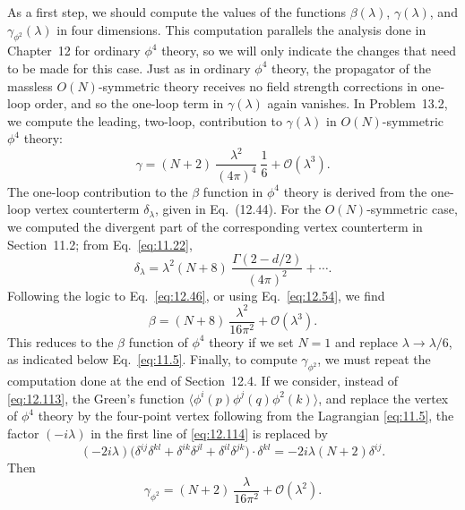 As a first step, we should compute the values of the functions
$\beta(\lambda)$, $\gamma(\lambda)$, and $\gamma_{\phi^2}(\lambda)$ in four
dimensions.  This computation parallels the analysis done in Chapter~12 for
ordinary $\phi^4$ theory, so we will only indicate the changes that need to
be made for this case.  Just as in ordinary $\phi^4$ theory, the propagator of
the massless $O(N)$-symmetric theory receives no field strength corrections
in one-loop order, and so the one-loop term in $\gamma(\lambda)$ again
vanishes.  In Problem~13.2, we compute the leading, two-loop, contribution to
$\gamma(\lambda)$ in $O(N)$-symmetric $\phi^4$ theory:
\begin{equation}
  \gamma = (N+2)\ \frac{\lambda^2}{(4\pi)^4}\ \frac{1}{6}
    + \mathcal{O}(\lambda^3) .
  \label{eq:13.47}
\end{equation}
The one-loop contribution to the $\beta$ function in $\phi^4$ theory is
derived from the one-loop vertex counterterm $\delta_\lambda$, given in
Eq.~(12.44).  For the $O(N)$-symmetric case, we computed the
divergent part of the corresponding vertex counterterm in Section~11.2; from
Eq.~\eqref{eq:11.22},
\begin{equation}
  \delta_\lambda = \lambda^2(N+8)\ \frac{\Gamma(2-d/2)}{(4\pi)^2}
    + \cdots .
  \label{eq:13.48}
\end{equation}
Following the logic to Eq.~\eqref{eq:12.46}, or using Eq.~\eqref{eq:12.54},
we find
\begin{equation}
  \beta = (N+8)\ \frac{\lambda^2}{16\pi^2} + \mathcal{O}(\lambda^3) .
  \label{eq:13.49}
\end{equation}
This reduces to the $\beta$ function of $\phi^4$ theory if we set $N = 1$ and
replace $\lambda\to\lambda/6$, as indicated below Eq.~\eqref{eq:11.5}.
Finally, to compute $\gamma_{\phi^2}$, we must repeat the computation done at
the end of Section~12.4.  If we consider, instead of \eqref{eq:12.113}, the
Green's function $\langle\phi^i(p)\phi^j(q)\phi^2(k)\rangle$, and replace the
vertex of $\phi^4$ theory by the four-point vertex following from the
Lagrangian \eqref{eq:11.5}, the factor $(-i\lambda)$ in the first line of
\eqref{eq:12.114} is replaced by
\begin{equation}
  (-2i\lambda)\bigl( \delta^{ij}\delta^{kl} + \delta^{ik}\delta^{jl}
    + \delta^{il}\delta^{jk} \bigr)\cdot\delta^{kl}
  = -2i\lambda(N+2)\delta^{ij} .
\end{equation}
Then
\begin{equation}
  \gamma_{\phi^2} = (N+2)\ \frac{\lambda}{16\pi^2} + \mathcal{O}(\lambda^2) .
  \label{eq:13.50}
\end{equation}

